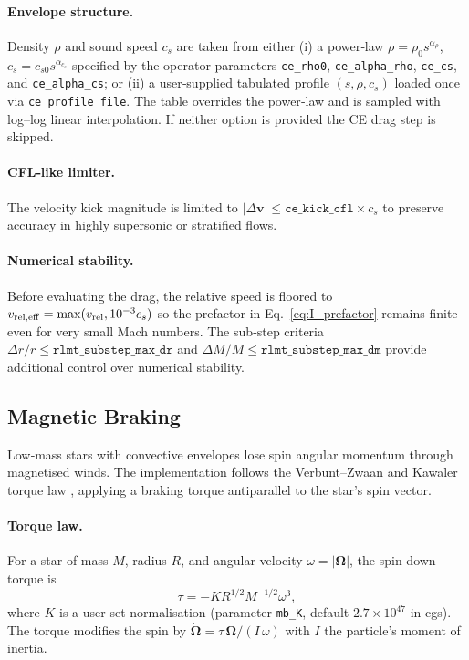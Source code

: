 \documentclass[11pt]{article}
\begin{document}
\paragraph{Envelope structure.}
Density $\rho$ and sound speed $c_s$ are taken from either
(i) a power‑law $\rho=\rho_0s^{\alpha_\rho}$, $c_s=c_{s0}s^{\alpha_{c_s}}$
specified by the operator parameters \texttt{ce\_rho0}, \texttt{ce\_alpha\_rho},
\texttt{ce\_cs}, and \texttt{ce\_alpha\_cs}; or
(ii) a user‑supplied tabulated profile $(s,\rho,c_s)$ loaded once via
\texttt{ce\_profile\_file}.  The table overrides the power‑law and is sampled
with log–log linear interpolation.  If neither option is provided the CE drag
step is skipped.

\paragraph{CFL‑like limiter.}
The velocity kick magnitude is limited to
$|\Delta\mathbf v|\le\texttt{ce\_kick\_cfl}\times c_s$ to preserve accuracy
in highly supersonic or stratified flows.

\paragraph{Numerical stability.}
Before evaluating the drag, the relative speed is floored to
$v_{\rm rel,eff}=\max(v_{\rm rel},10^{-3}c_s)$ so the prefactor in
Eq.~\eqref{eq:I_prefactor} remains finite even for very small Mach numbers.
The sub‑step criteria $\Delta r/r\le\texttt{rlmt\_substep\_max\_dr}$ and
$\Delta M/M\le\texttt{rlmt\_substep\_max\_dm}$ provide additional control over
numerical stability.

\subsection{Magnetic Braking}
\label{sec:mb}

Low‑mass stars with convective envelopes lose spin angular momentum through
magnetised winds.  The implementation follows the Verbunt–Zwaan and Kawaler
torque law \citep{Verbunt1981,Kawaler1988}, applying a braking torque
antiparallel to the star's spin vector.

\paragraph{Torque law.} For a star of mass $M$, radius $R$, and angular
velocity $\omega = |\bm\Omega|$, the spin‑down torque is
\begin{equation}
\tau = -K R^{1/2} M^{-1/2} \omega^3,
\label{eq:mb_torque}
\end{equation}
where $K$ is a user‑set normalisation (parameter \texttt{mb\_K}, default
$2.7\times10^{47}$ in cgs).  The torque modifies the spin by
$\dot{\bm\Omega}=\tau\,\bm\Omega/(I\,\omega)$ with $I$ the particle's moment
of inertia.
\end{document}
